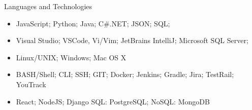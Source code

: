 \documentclass[]{mcdowellcv}
\begin{document}
	\begin{cvsection}{Languages and Technologies}
		\begin{cvsubsection}{}{}{}	
			\begin{itemize}
				\item JavaScript; Python; Java; C\#.NET; JSON; SQL; 
				\item Visual Studio; VSCode, Vi/Vim; JetBrains IntelliJ; Microsoft SQL Server;
				\item Linux/UNIX; Windows; Mac OS X
				\item BASH/Shell; CLI; SSH; GIT; Docker; Jenkins; Gradle; Jira; TestRail; YouTrack
				\item React; NodeJS; Django SQL: PostgreSQL; NoSQL: MongoDB
			\end{itemize}
		\end{cvsubsection}
	\end{cvsection}
	
\end{document}
